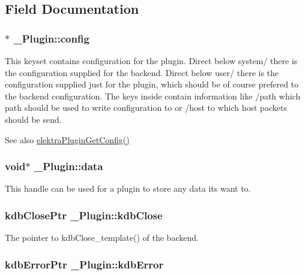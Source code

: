 \subsection{Field Documentation}
\hypertarget{struct__Plugin_ab2515d2e11eec337550300d6f56a3d4b}{
\subsubsection[{config}]{$\ast$ {\bf \_\-Plugin::config}}}
\label{struct__Plugin_ab2515d2e11eec337550300d6f56a3d4b}
This keyset contains configuration for the plugin. Direct below system/ there is the configuration supplied for the backend. Direct below user/ there is the configuration supplied just for the plugin, which should be of course prefered to the backend configuration. The keys inside contain information like /path which path should be used to write configuration to or /host to which host packets should be send. \begin{DoxySeeAlso}{See also}
\hyperlink{group__plugin_ga644bead796506c172817724051c977c9}{elektraPluginGetConfig()} 
\end{DoxySeeAlso}
\hypertarget{struct__Plugin_ad2e6fd0b76939b20008e9cc046a06779}{
\subsubsection[{data}]{\setlength{\rightskip}{0pt plus 5cm}void$\ast$ {\bf \_\-Plugin::data}}}
\label{struct__Plugin_ad2e6fd0b76939b20008e9cc046a06779}
This handle can be used for a plugin to store any data its want to. \hypertarget{struct__Plugin_a5b0b2cc22ad5dcc7ec0eb570c2c6ff4b}{
\subsubsection[{kdbClose}]{\setlength{\rightskip}{0pt plus 5cm}kdbClosePtr {\bf \_\-Plugin::kdbClose}}}
\label{struct__Plugin_a5b0b2cc22ad5dcc7ec0eb570c2c6ff4b}
The pointer to kdbClose\_\-template() of the backend. \hypertarget{struct__Plugin_a621683acebfa6aac91c5903d8f6d653a}{
\subsubsection[{kdbError}]{\setlength{\rightskip}{0pt plus 5cm}kdbErrorPtr {\bf \_\-Plugin::kdbError}}}
